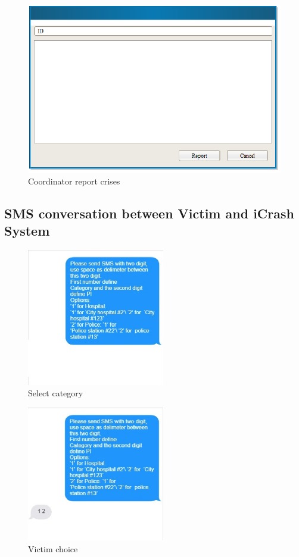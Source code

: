 \begin{figure}
  \centering
    \includegraphics[scale=0.75]{images/mockups/other/ReportCrises.eps}
  \caption{Coordinator report crises}
  \label{fig:CoordinatorReportCrises}
\end{figure}


\subsection{SMS conversation between Victim and iCrash System}

\begin{figure}
  \centering
    \includegraphics[width=6cm]{images/mockups/feature3-PI/iCrashSendsOptions.eps}
  \caption{Select category}
  \label{fig:Selectcategory}
\end{figure}


\begin{figure}
  \centering
    \includegraphics[width=6cm]{images/mockups/feature3-PI/UserSelectedOption.eps}
  \caption{Victim choice}
  \label{fig:Victimchoice}
\end{figure}  


